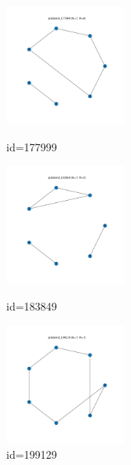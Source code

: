 \documentclass[a4paper, 10pt, dvipdfmx]{jlreq}
\begin{document}
\begin{figure}[htbp]
  \begin{minipage}{0.33\hsize}
    \begin{center}
      \includegraphics[width=40mm]{./img_5/problem4_177999.png}
    \end{center}
    \caption{id=177999}
  \end{minipage}
  \begin{minipage}{0.33\hsize}
    \begin{center}
      \includegraphics[width=40mm]{./img_5/problem4_183849.png}
    \end{center}
    \caption{id=183849}
  \end{minipage}
  \begin{minipage}{0.33\hsize}
    \begin{center}
      \includegraphics[width=40mm]{./img_5/problem4_199129.png}
    \end{center}
    \caption{id=199129}
  \end{minipage}
\end{figure}
\end{document}
